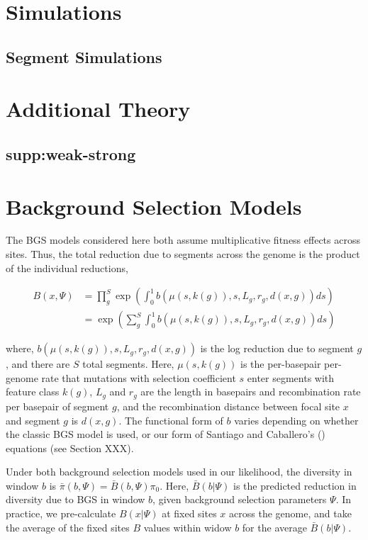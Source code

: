 \documentclass[11pt]{article}
\begin{document}
\section{Simulations}

\subsection{Segment Simulations}


\section{Additional Theory}

\subsection{supp:weak-strong}


\section{Background Selection Models}

The BGS models considered here both assume multiplicative fitness effects
across sites. Thus, the total reduction due to segments across the genome is
the product of the individual reductions, 

\begin{align}
  \label{suppeqn:b}
  B(x, \Psi) &= \prod_g^S \exp \left( \int_0^1 b(\mu(s, k(g)), s, L_g, r_g, d(x, g)) ds \right) \\
             &= \exp \left( \sum_g^S \int_0^1 b(\mu(s, k(g)), s, L_g, r_g, d(x, g)) ds \right)
\end{align}

where, $b(\mu(s, k(g)), s, L_g, r_g, d(x,g))$ is the log reduction due to
segment $g$, and there are $S$ total segments. Here, $\mu(s, k(g))$ is the
per-basepair per-genome rate that mutations with selection coefficient $s$
enter segments with feature class $k(g)$, $L_g$ and $r_g$ are the length in
basepairs and recombination rate per basepair of segment $g$, and the
recombination distance between focal site $x$ and segment $g$ is $d(x, g)$. The
functional form of $b$ varies depending on whether the classic BGS model is
used, or our form of Santiago and Caballero's (\citeyear{Santiago2016-mu})
equations (see Section XXX).

Under both background selection models used in our likelihood, the diversity in
window $b$ is $\bar{\pi}(b, \Psi) = \bar{B}(b, \Psi) \pi_0$. Here, $\bar{B}(b |
\Psi)$ is the predicted reduction in diversity due to BGS in window $b$, given
background selection parameters $\Psi$. In practice, we pre-calculate $B(x |
\Psi)$ at fixed sites $x$ across the genome, and take the average of the fixed
sites $B$ values within widow $b$ for the average $\bar{B}(b | \Psi)$. 
\end{document}
